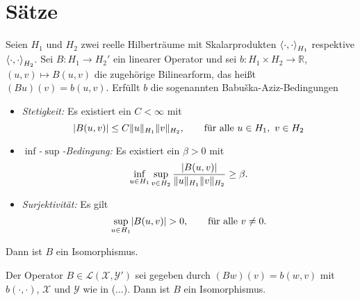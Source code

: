 
\section{Sätze} %
\label{sec:saetze}

\begin{Satz}
    \label{satz:babuska-aziz}
    Seien $H_{1}$ und $H_{2}$ zwei reelle Hilberträume mit Skalarprodukten $\left\langle\cdot,\cdot\right\rangle_{H_{1}}$ respektive $\left\langle\cdot,\cdot\right\rangle_{H_{2}}$. 
    Sei $B \colon H_{1} \to H_{2}'$ ein linearer Operator und
    sei $b \colon H_{1} \times H_{2} \to \mathbb{R}$, $(u, v) \mapsto B(u, v)$ die zugehörige Bilinearform, das heißt $(Bu)(v) = b(u, v)$. 
    Erfüllt $b$ die sogenannten Babu{\v{s}}ka-Aziz-Bedingungen
    \begin{itemize}
        \item \emph{Stetigkeit:} Es existiert ein $C < \infty$ mit 
        \begin{equation}
            \lvert B(u, v)\rvert \leq C \lVert u\rVert_{H_{1}} \lVert v\rVert_{H_{2}}, \qquad \text{für alle}~u \in H_{1},~v \in H_{2}
        \end{equation}
        \item \emph{$\inf$-$\sup$-Bedingung:} Es existiert ein $\beta > 0$ mit 
        \begin{equation}
            \inf_{u \in H_{1}} \sup_{v \in H_{2}} \frac{\lvert B(u, v)\rvert}{\lVert u\rVert_{H_{1}} \lVert v\rVert_{H_{2}}} \geq \beta.
        \end{equation}
        \item \emph{Surjektivität:} Es gilt
        \begin{equation}
            \sup_{u \in H_{1}} \lvert B(u, v)\rvert > 0, \qquad \text{für alle}~v \neq 0.
        \end{equation}
    \end{itemize}
    Dann ist $B$ ein Isomorphismus.
\end{Satz}

\begin{Satz}
    Der Operator $B \in \mathcal L(\mathcal X, \mathcal Y')$ sei gegeben durch $(Bw)(v) = b(w, v)$ mit $b(\cdot, \cdot)$, $\mathcal X$ und $\mathcal Y$ wie in (...).
    Dann ist $B$ ein Isomorphismus.
\end{Satz}

\begin{Satz}
    
\end{Satz}

